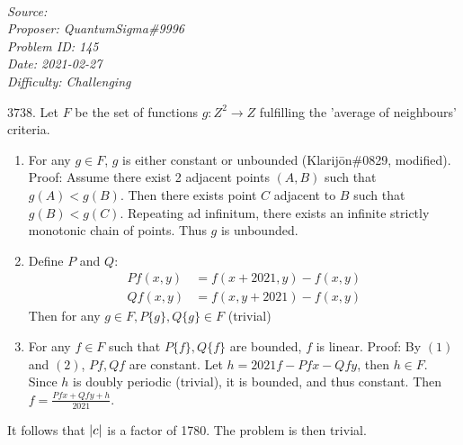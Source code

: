 
\SSbreak\\
\emph{Source: \Cop}\\
\emph{Proposer: QuantumSigma\#9996}\\
\emph{Problem ID: 145}\\
\emph{Date: 2021-02-27}\\
\emph{Difficulty: Challenging}\\
\SSbreak

\bigskip

\begin{solution}\hfil\medskip
    $3738.$
Let $F$ be the set of functions $g: Z^2 \rightarrow Z$ fulfilling the 'average of neighbours' criteria.
\begin{enumerate}
    \item For any $g \in F$, $g$ is either constant or unbounded (Klarijōn\#0829, modified). Proof: Assume there exist 2 adjacent points $(A, B)$ such that $g(A) < g(B)$. Then there exists point $C$ adjacent to $B$ such that $g(B) < g(C)$. Repeating ad infinitum, there exists an infinite strictly monotonic chain of points. Thus $g$ is unbounded.
    \item Define $P$ and $Q$:
    \begin{align*}
        P{f}(x, y) &= f(x + 2021, y) - f(x, y)\\
        Q{f}(x, y) &= f(x, y + 2021) - f(x, y)
    \end{align*}
    Then for any $g \in F, P\{g\}, Q\{g\} \in F$ (trivial)
    \item For any $f \in F$ such that $P\{f\}, Q\{f\}$ are bounded, $f$ is linear. Proof: By $(1)$ and $(2)$, $P{f}, Q{f}$ are constant. Let $h = 2021f - P{f}x - Q{f}y$, then $h \in F$. Since $h$ is doubly periodic (trivial), it is bounded, and thus constant. Then $f = \frac{P{f}x + Q{f}y + h}{2021}$.
\end{enumerate}
It follows that $\left\lvert c\right\rvert$ is a factor of 1780.
The problem is then trivial.
\end{solution}\bigskip
